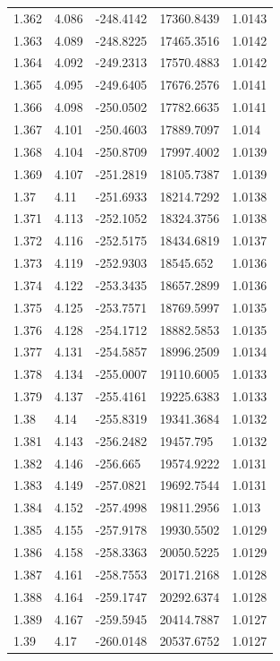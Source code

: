 \begin{tabular}{lllll}
1.362 & 4.086 & -248.4142 & 17360.8439 & 1.0143 \\
1.363 & 4.089 & -248.8225 & 17465.3516 & 1.0142 \\
1.364 & 4.092 & -249.2313 & 17570.4883 & 1.0142 \\
1.365 & 4.095 & -249.6405 & 17676.2576 & 1.0141 \\
1.366 & 4.098 & -250.0502 & 17782.6635 & 1.0141 \\
1.367 & 4.101 & -250.4603 & 17889.7097 & 1.014 \\
1.368 & 4.104 & -250.8709 & 17997.4002 & 1.0139 \\
1.369 & 4.107 & -251.2819 & 18105.7387 & 1.0139 \\
1.37 & 4.11 & -251.6933 & 18214.7292 & 1.0138 \\
1.371 & 4.113 & -252.1052 & 18324.3756 & 1.0138 \\
1.372 & 4.116 & -252.5175 & 18434.6819 & 1.0137 \\
1.373 & 4.119 & -252.9303 & 18545.652 & 1.0136 \\
1.374 & 4.122 & -253.3435 & 18657.2899 & 1.0136 \\
1.375 & 4.125 & -253.7571 & 18769.5997 & 1.0135 \\
1.376 & 4.128 & -254.1712 & 18882.5853 & 1.0135 \\
1.377 & 4.131 & -254.5857 & 18996.2509 & 1.0134 \\
1.378 & 4.134 & -255.0007 & 19110.6005 & 1.0133 \\
1.379 & 4.137 & -255.4161 & 19225.6383 & 1.0133 \\
1.38 & 4.14 & -255.8319 & 19341.3684 & 1.0132 \\
1.381 & 4.143 & -256.2482 & 19457.795 & 1.0132 \\
1.382 & 4.146 & -256.665 & 19574.9222 & 1.0131 \\
1.383 & 4.149 & -257.0821 & 19692.7544 & 1.0131 \\
1.384 & 4.152 & -257.4998 & 19811.2956 & 1.013 \\
1.385 & 4.155 & -257.9178 & 19930.5502 & 1.0129 \\
1.386 & 4.158 & -258.3363 & 20050.5225 & 1.0129 \\
1.387 & 4.161 & -258.7553 & 20171.2168 & 1.0128 \\
1.388 & 4.164 & -259.1747 & 20292.6374 & 1.0128 \\
1.389 & 4.167 & -259.5945 & 20414.7887 & 1.0127 \\
1.39 & 4.17 & -260.0148 & 20537.6752 & 1.0127 \\

\end{tabular}

